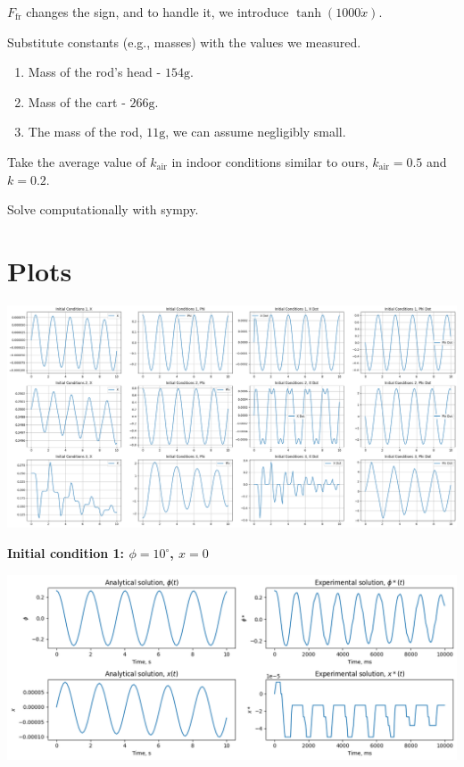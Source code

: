 \documentclass{article}
\begin{document}
$F_\text{fr}$ changes the sign, and to handle it, we introduce $\tanh(1000 \dot{x})$.

Substitute constants (e.g., masses) with the values we measured.

\begin{enumerate}
  \item Mass of the rod's head - $154 \text{g}$.

  \item Mass of the cart - $266 \text{g}$.

  \item The mass of the rod, $11 \text{g}$, we can assume negligibly small.
\end{enumerate}

Take the average value of $k_\text{air}$ in indoor conditions similar to ours, $k_\text{air} = 0.5$ and $k = 0.2$.

Solve computationally with sympy.

\section{Plots}
\includegraphics*[scale=0.25]{plots/analytical_sol_plots.png}

\textbf{Initial condition 1: $\phi = 10^\circ$, $x = 0$}

\includegraphics*[scale=0.45]{plots/res_comparison_init1.png}
\end{document}
